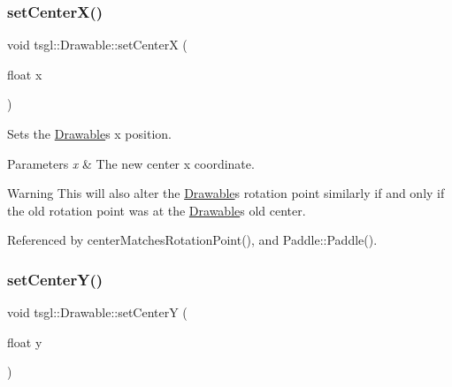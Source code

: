 \mbox{\label{classtsgl_1_1_drawable_a100ed2db1357cd6bae7f991fcc353b8a}} 
\subsubsection{\texorpdfstring{set\+Center\+X()}{setCenterX()}}
{\footnotesize\ttfamily void tsgl\+::\+Drawable\+::set\+CenterX (\begin{DoxyParamCaption}\item[{float}]{x }\end{DoxyParamCaption})\hspace{0.3cm}{\ttfamily [virtual]}}



Sets the \hyperlink{classtsgl_1_1_drawable}{Drawable}\textquotesingle{}s x position. 


\begin{DoxyParams}{Parameters}
{\em x} & The new center x coordinate. \\
\hline
\end{DoxyParams}
\begin{DoxyWarning}{Warning}
This will also alter the \hyperlink{classtsgl_1_1_drawable}{Drawable}\textquotesingle{}s rotation point similarly if and only if the old rotation point was at the \hyperlink{classtsgl_1_1_drawable}{Drawable}\textquotesingle{}s old center. 
\end{DoxyWarning}


Referenced by center\+Matches\+Rotation\+Point(), and Paddle\+::\+Paddle().

\mbox{\label{classtsgl_1_1_drawable_a389f768e42b01bf0553120c39e079a52}} 
\subsubsection{\texorpdfstring{set\+Center\+Y()}{setCenterY()}}
{\footnotesize\ttfamily void tsgl\+::\+Drawable\+::set\+CenterY (\begin{DoxyParamCaption}\item[{float}]{y }\end{DoxyParamCaption})\hspace{0.3cm}{\ttfamily [virtual]}}



